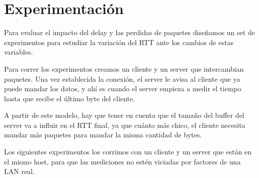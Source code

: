 \section{Experimentaci\'on}

Para evaluar el impacto del delay y las perdidas de paquetes dise\~namos un set de experimentos para estudiar la variaci\'on del RTT ante los cambios de estas variables. 

Para correr los experimentos creamos un cliente y un server que intercambian paquetes. Una vez establecida la conexi\'on, el server le avisa al cliente que ya puede mandar los datos, y ah\'i es cuando el server empieza a medir el tiempo hasta que recibe el \'ultimo byte del cliente. 

A partir de este modelo, hay que tener en cuenta que el tama\~no del buffer del server va a influir en el RTT final, ya que cu\'anto m\'as chico, el cliente necesita mandar m\'as paquetes para mandar la misma cantidad de bytes. 

Los siguientes experimentos los corrimos con un cliente y un server que est\'an en el mismo host, para que las mediciones no est\'en viciadas por factores de una LAN real. 

